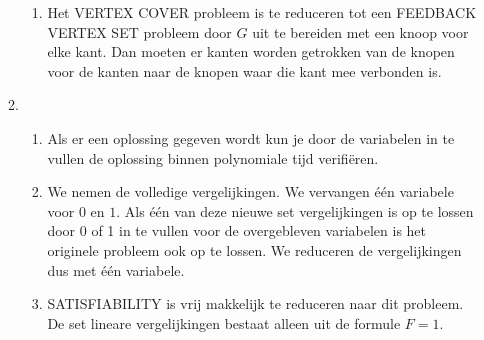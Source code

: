 \documentclass[11pt]{article}
\begin{document}
\begin{enumerate}
\begin{enumerate}
\begin{enumerate}[a]
                    \item
                        Het VERTEX COVER probleem is te reduceren tot een
                        FEEDBACK VERTEX SET probleem door $G$ uit te bereiden
                        met een knoop voor elke kant. Dan moeten er kanten
                        worden getrokken van de knopen voor de kanten naar de
                        knopen waar die kant mee verbonden is.

                \end{enumerate}
            \item
                \begin{enumerate}[a]
                    \item
                        Als er een oplossing gegeven wordt kun je door de
                        variabelen in te vullen de oplossing binnen polynomiale
                        tijd verifi\"{e}ren.

                    \item
                        We nemen de volledige vergelijkingen. We vervangen
                        \'{e}\'{e}n variabele voor $0$ en $1$. Als één van deze
                        nieuwe set vergelijkingen is op te lossen door 0 of 1 in
                        te vullen voor de overgebleven variabelen is het
                        originele probleem ook op te lossen. We reduceren
                        de vergelijkingen dus met één variabele.

                    \item
                        SATISFIABILITY is vrij makkelijk te reduceren naar dit
                        probleem. De set lineare vergelijkingen bestaat alleen
                        uit de formule $F=1$.

                \end{enumerate}

        \end{enumerate}
\end{enumerate}
\end{document}
